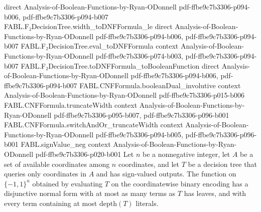 \begin{theorem}
  {direct}
  {Analysis-of-Boolean-Functions-by-Ryan-ODonnell}
  {pdf-ffbe9c7b3306-p094-b006,
    pdf-ffbe9c7b3306-p094-b007}
\proofstep
  {FABL.F₂DecisionTree.width_toDNFFormula_le}
  {direct}
  {Analysis-of-Boolean-Functions-by-Ryan-ODonnell}
  {pdf-ffbe9c7b3306-p094-b006,
    pdf-ffbe9c7b3306-p094-b007}
\proofstep
  {FABL.F₂DecisionTree.eval_toDNFFormula}
  {context}
  {Analysis-of-Boolean-Functions-by-Ryan-ODonnell}
  {pdf-ffbe9c7b3306-p074-b003,
    pdf-ffbe9c7b3306-p094-b007}
\proofstep
  {FABL.F₂DecisionTree.toDNFFormula_toBooleanFunction}
  {direct}
  {Analysis-of-Boolean-Functions-by-Ryan-ODonnell}
  {pdf-ffbe9c7b3306-p094-b006,
    pdf-ffbe9c7b3306-p094-b007}
\proofstep
  {FABL.CNFFormula.booleanDual_involutive}
  {context}
  {Analysis-of-Boolean-Functions-by-Ryan-ODonnell}
  {pdf-ffbe9c7b3306-p015-b006}
\proofstep
  {FABL.CNFFormula.truncateWidth}
  {context}
  {Analysis-of-Boolean-Functions-by-Ryan-ODonnell}
  {pdf-ffbe9c7b3306-p095-b007,
    pdf-ffbe9c7b3306-p096-b001}
\proofstep
  {FABL.CNFFormula.switchAndOr_truncateWidth}
  {context}
  {Analysis-of-Boolean-Functions-by-Ryan-ODonnell}
  {pdf-ffbe9c7b3306-p094-b005,
    pdf-ffbe9c7b3306-p096-b001}
\proofstep
  {FABL.signValue_neg}
  {context}
  {Analysis-of-Boolean-Functions-by-Ryan-ODonnell}
  {pdf-ffbe9c7b3306-p020-b001}
Let $n$ be a nonnegative integer, let $A$ be a set of available coordinates among $n$
coordinates, and let $T$ be a decision tree that queries only coordinates in $A$ and has
sign-valued outputs. The function on $\{−1,1\}^n$ obtained by evaluating $T$ on the
coordinatewise binary encoding has a disjunctive normal form with at most as many terms
as $T$ has leaves, and with every term containing at most $\mathrm{depth}(T)$ literals.
\end{theorem}

